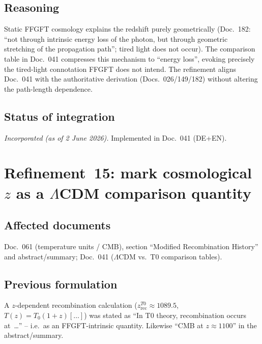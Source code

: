 \subsection*{Reasoning}

Static FFGFT cosmology explains the redshift purely geometrically
(Doc.~182: \enquote{not through intrinsic energy loss of the photon, but
through geometric stretching of the propagation path}; tired light does not
occur). The comparison table in Doc.~041 compresses this mechanism to
\enquote{energy loss}, evoking precisely the tired-light connotation FFGFT
does not intend. The refinement aligns Doc.~041 with the authoritative
derivation (Docs.~026/149/182) without altering the path-length dependence.

\subsection*{Status of integration}

\emph{Incorporated (as of 2 June 2026).} Implemented in Doc.~041 (DE+EN).

\section{\texorpdfstring{Refinement~15: mark cosmological $z$ as a $\Lambda$CDM comparison quantity}{Refinement 15: mark cosmological z as a LambdaCDM comparison quantity}}

\subsection*{Affected documents}

Doc.~061 (temperature units / CMB), section \enquote{Modified Recombination
History} and abstract/summary; Doc.~041 ($\Lambda$CDM vs.\ T0 comparison
tables).

\subsection*{Previous formulation}

A $z$-dependent recombination calculation ($z_{\text{rec}}^{T0}\approx 1089.5$,
$T(z)=T_0(1+z)[\dots]$) was stated as \enquote{In T0 theory, recombination
occurs at~\dots} -- i.e.\ as an FFGFT-intrinsic quantity. Likewise
\enquote{CMB at $z\approx 1100$} in the abstract/summary.

